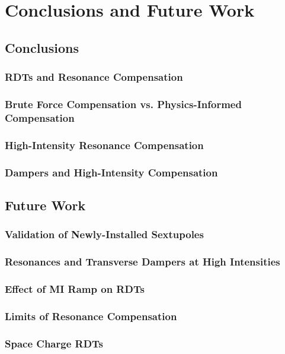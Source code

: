 \chapter{Conclusions and Future Work}
\label{sec:ch7}

\section{Conclusions}

\subsection{RDTs and Resonance Compensation}

\subsection{Brute Force Compensation vs. Physics-Informed Compensation}

\subsection{High-Intensity Resonance Compensation}

\subsection{Dampers and High-Intensity Compensation}

\section{Future Work}

\subsection{Validation of Newly-Installed Sextupoles}

\subsection{Resonances and Transverse Dampers at High Intensities}

\subsection{Effect of MI Ramp on RDTs}

\subsection{Limits of Resonance Compensation}

\subsection{Space Charge RDTs}
\cite{cris1} \cite{cris2}
